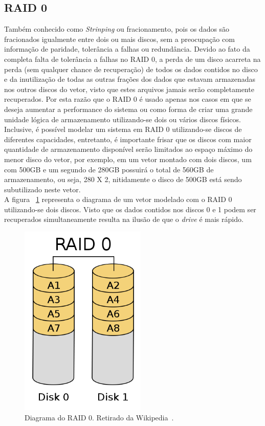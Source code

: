 		\subsection{RAID 0}
		
		Também conhecido como \textit{Strinping} ou fracionamento, pois os dados são fracionados igualmente entre dois ou mais discos, sem a preocupação com informação de paridade, tolerância a falhas ou redundância. Devido ao fato da completa falta de tolerância a falhas no RAID 0, a perda de um disco acarreta na perda (sem qualquer chance de recuperação) de todos os dados contidos no disco e da inutilização de todas as outras frações dos dados que estavam armazenadas nos outros discos do vetor, visto que estes arquivos jamais serão completamente recuperados. Por esta razão que o RAID 0 é usado apenas nos casos em que se deseja aumentar a performance do sistema ou como forma de criar uma grande unidade lógica de armazenamento utilizando-se dois ou vários discos físicos. Inclusive, é possível modelar um sistema em RAID 0 utilizando-se discos de diferentes capacidades, entretanto, é importante frisar que os discos com maior quantidade de armazenamento disponível serão limitados ao espaço máximo do menor disco do vetor, por exemplo, em um vetor montado com dois discos, um com 500GB e um segundo de 280GB possuirá o total de 560GB de armazenamento, ou seja, 280 X 2, nitidamente o disco de 500GB está sendo subutilizado neste vetor. \\
		
		A figura ~\ref{fig:raid0} representa o diagrama de um vetor modelado com o RAID 0 utilizando-se dois discos. Visto que os dados contidos nos discos 0 e 1 podem ser recuperados simultaneamente resulta na ilusão de que o \textit{drive} é mais rápido.\\
		
		\begin{figure}[htb]
			\begin{center}
				
				\includegraphics[clip,width=6.0cm]{images/RAID_0.png}
				\caption{Diagrama do RAID 0. Retirado da Wikipedia~\citep{wikiRAIDlevels}.}
				\label{fig:raid0}
			\end{center}
		\end{figure} 
		
